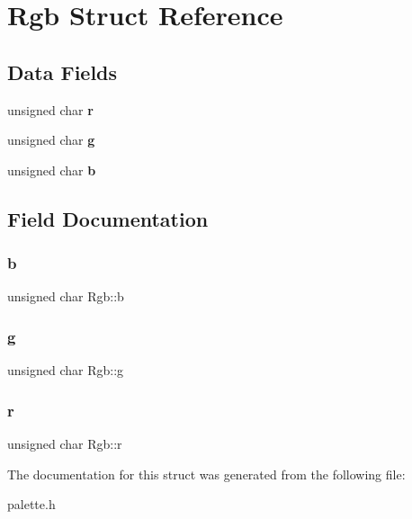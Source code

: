 \hypertarget{struct_rgb}{}\section{Rgb Struct Reference}
\label{struct_rgb}
\subsection*{Data Fields}
\begin{DoxyCompactItemize}
\item 
\mbox{\label{struct_rgb_a3da778daa4ccbc628c478b21d6093df5}} 
unsigned char {\bfseries r}
\item 
\mbox{\label{struct_rgb_a27a8958ecb91f5f98ee520129a396ce3}} 
unsigned char {\bfseries g}
\item 
\mbox{\label{struct_rgb_acab4ec8e0d55174258da75ee80f69bef}} 
unsigned char {\bfseries b}
\end{DoxyCompactItemize}


\subsection{Field Documentation}
\mbox{\label{struct_rgb_acab4ec8e0d55174258da75ee80f69bef}} 
\subsubsection{\texorpdfstring{b}{b}}
{\footnotesize\ttfamily unsigned char Rgb\+::b}

\mbox{\label{struct_rgb_a27a8958ecb91f5f98ee520129a396ce3}} 
\subsubsection{\texorpdfstring{g}{g}}
{\footnotesize\ttfamily unsigned char Rgb\+::g}

\mbox{\label{struct_rgb_a3da778daa4ccbc628c478b21d6093df5}} 
\subsubsection{\texorpdfstring{r}{r}}
{\footnotesize\ttfamily unsigned char Rgb\+::r}



The documentation for this struct was generated from the following file\+:\begin{DoxyCompactItemize}
\item 
palette.\+h\end{DoxyCompactItemize}
